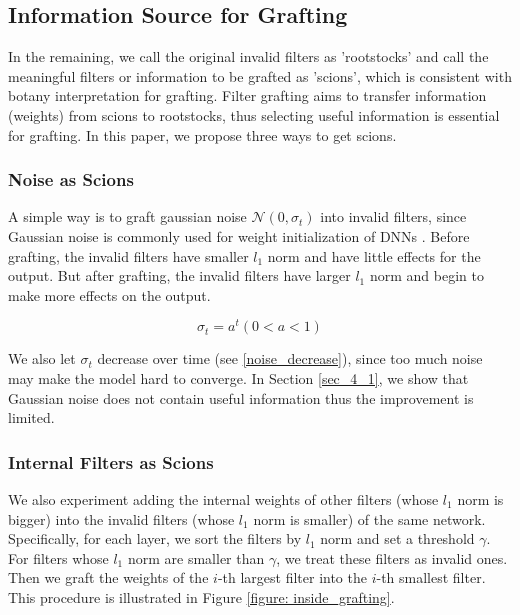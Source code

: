 \documentclass{article}
\begin{document}
\subsection{Information Source for Grafting}\label{sec_3_1}
In the remaining, we call the original invalid filters as 'rootstocks' and call the meaningful filters or information to be grafted as 'scions', which is consistent with botany interpretation for grafting. Filter grafting aims to transfer information (weights) from scions to rootstocks, thus selecting useful information is essential for grafting. In this paper, we propose three ways to get scions.

\subsubsection{Noise as Scions}\label{sec_3_1_1}

A simple way is to graft gaussian noise $ \mathcal{N}(0,\sigma_{t})$ into invalid filters, since Gaussian noise is commonly used for weight initialization of DNNs \cite{kumar2017weight,he2015delving}. 
Before grafting, the invalid filters have smaller $l_{1}$ norm and have little effects for the output.
But after grafting, the invalid filters have larger $l_{1}$ norm and begin to make more effects on the output. 

\begin{equation}\label{noise_decrease}
	\sigma_{t}=a^t(0<a<1)
\end{equation}

We also let $\sigma_{t}$ decrease over time (see \eqref{noise_decrease}), since too much noise may make the model hard to converge. In Section \ref{sec_4_1}, we show that Gaussian noise does not contain useful information thus the improvement is limited.

\subsubsection{Internal Filters as Scions}\label{sec_3_1_2}

We also experiment adding the internal weights of other filters (whose $l_{1}$ norm is bigger) into the invalid filters (whose $l_{1}$ norm is smaller) of the same network. Specifically, for each layer, we sort the filters by $l_{1}$ norm and set a threshold $\gamma$. For filters whose $l_{1}$ norm are smaller than $\gamma$, we treat these filters as invalid ones. Then we graft the weights of the $i$-th largest filter into the $i$-th smallest filter. This procedure is illustrated in Figure \ref{figure: inside_grafting}.
\end{document}
